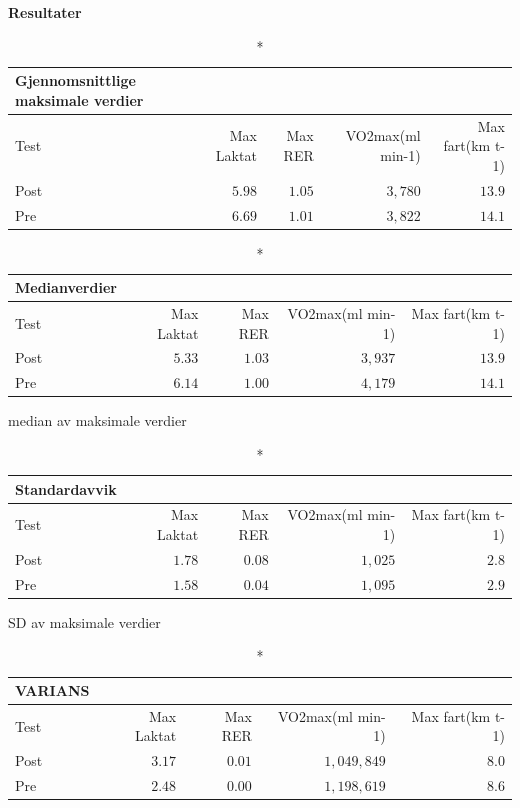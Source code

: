 \documentclass[
  letterpaper,
  DIV=11,
  numbers=noendperiod]{scrreprt}
\begin{document}
\textbf{Resultater}

\begin{longtable}{lrrrr}
\caption*{
{\large Gjennomsnittlige maksimale verdier}
} \\ 
\toprule
Test & Max Laktat & Max RER & VO2max(ml min-1) & Max fart(km t-1) \\ 
\midrule
Post & $5.98$ & $1.05$ & $3,780$ & $13.9$ \\ 
Pre & $6.69$ & $1.01$ & $3,822$ & $14.1$ \\ 
\bottomrule
\end{longtable}

\setlength{\LTpost}{0mm}
\begin{longtable}{lrrrr}
\caption*{
{\large Medianverdier}
} \\ 
\toprule
Test & Max Laktat & Max RER & VO2max(ml min-1) & Max fart(km t-1) \\ 
\midrule
Post & $5.33$ & $1.03$ & $3,937$ & $13.9$ \\ 
Pre & $6.14$ & $1.00$ & $4,179$ & $14.1$ \\ 
\bottomrule
\end{longtable}
\begin{minipage}{\linewidth}
median av maksimale verdier\\
\end{minipage}

\setlength{\LTpost}{0mm}
\begin{longtable}{lrrrr}
\caption*{
{\large Standardavvik}
} \\ 
\toprule
Test & Max Laktat & Max RER & VO2max(ml min-1) & Max fart(km t-1) \\ 
\midrule
Post & $1.78$ & $0.08$ & $1,025$ & $2.8$ \\ 
Pre & $1.58$ & $0.04$ & $1,095$ & $2.9$ \\ 
\bottomrule
\end{longtable}
\begin{minipage}{\linewidth}
SD av maksimale verdier\\
\end{minipage}

\begin{longtable}{lrrrr}
\caption*{
{\large VARIANS}
} \\ 
\toprule
Test & Max Laktat & Max RER & VO2max(ml min-1) & Max fart(km t-1) \\ 
\midrule
Post & $3.17$ & $0.01$ & $1,049,849$ & $8.0$ \\ 
Pre & $2.48$ & $0.00$ & $1,198,619$ & $8.6$ \\ 
\bottomrule
\end{longtable}
\end{document}
